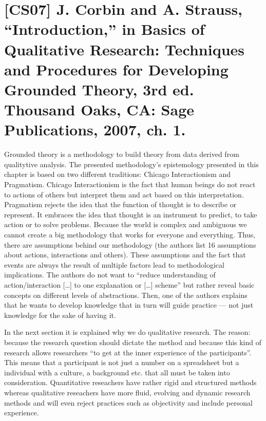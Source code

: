 \documentclass[a4paper,12pt,english]{scrartcl}
\newcommand{\papertitle}[2]{
	\section{[#1] #2}
}
\begin{document}
\pagestyle{fancy} %

\papertitle{CS07}{J. Corbin and A. Strauss, \enquote{Introduction,} in Basics of Qualitative Research: Techniques and Procedures for Developing Grounded Theory, 3rd ed. Thousand Oaks, CA: Sage Publications, 2007, ch. 1.}


Grounded theory is a methodology to build theory from data derived from qualitytive analysis. The presented methodology's epistemology presented in this chapter is based on two different traditions: Chicago Interactionism and Pragmatism. Chicago Interactionism is the fact that human beings do not react to actions of others but interpret them and act based on this interpretation. Pragmatism rejects the idea that the function of thought is to describe or represent. It embraces the idea that thought is an instrument to predict, to take action or to solve problems. Because the world is complex and ambiguous we cannot create a big methodology that works for everyone and everything. Thus, there are assumptions behind our methodology (the authors list 16 assumptions about actions, interactions and others). These assumptions and the fact that events are always the result of multiple factors lead to methodological implications. The authors do not want to \enquote{reduce understanding of action/interaction [\ldots] to one explanation or [\ldots] scheme} but rather reveal basic concepts on different levels of abstractions. Then, one of the authors explains that he wants to develop knowledge that in turn will guide practice --- not just knowledge for the sake of having it.

In the next section it is explained why we do qualitative research. The reason: because the research question should dictate the method and because this kind of research allows researchers \enquote{to get at the inner experience of the participants}. This means that a participant is not just a number on a spreadsheet but a individual with a culture, a background etc. that all must be taken into consideration. Quantitative reseachers have rather rigid and structured methods whereas qualitative reseachers have more fluid, evolving and dynamic research methods and will even reject practices such as objectivity and include personal experience.
\end{document}
